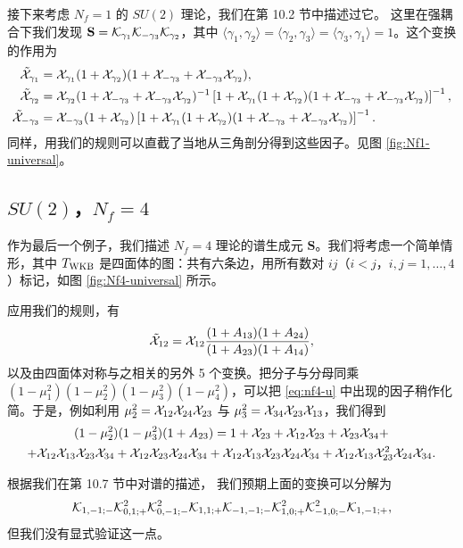 接下来考虑 $N_f=1$ 的 $SU(2)$ 理论，我们在第 10.2 节中描述过它。%
这里在强耦合下我们发现 $\mathbf S=\mathcal{K}_{\gamma_1}\mathcal{K}_{-\gamma_3}\mathcal{K}_{\gamma_2}$，其中 $\langle\gamma_1,\gamma_2\rangle=\langle\gamma_2,\gamma_3\rangle=\langle\gamma_3,\gamma_1\rangle=1$。这个变换的作用为
\begin{align}
\tilde{\mathcal{X}}_{\gamma_1}&=\mathcal{X}_{\gamma_1}(1+\mathcal{X}_{\gamma_2})(1+\mathcal{X}_{-\gamma_3}+\mathcal{X}_{-\gamma_3}\mathcal{X}_{\gamma_2}),\\
\tilde{\mathcal{X}}_{\gamma_2}&=\mathcal{X}_{\gamma_2}(1+\mathcal{X}_{-\gamma_3}+\mathcal{X}_{-\gamma_3}\mathcal{X}_{\gamma_2})^{-1}\left[1+\mathcal{X}_{\gamma_1}(1+\mathcal{X}_{\gamma_2})(1+\mathcal{X}_{-\gamma_3}+\mathcal{X}_{-\gamma_3}\mathcal{X}_{\gamma_2})\right]^{-1},\\
\tilde{\mathcal{X}}_{-\gamma_3}&=\mathcal{X}_{-\gamma_3}(1+\mathcal{X}_{\gamma_2})\left[1+\mathcal{X}_{\gamma_1}(1+\mathcal{X}_{\gamma_2})(1+\mathcal{X}_{-\gamma_3}+\mathcal{X}_{-\gamma_3}\mathcal{X}_{\gamma_2})\right]^{-1}.
\end{align}
同样，用我们的规则可以直截了当地从三角剖分得到这些因子。见图 \ref{fig:Nf1-universal}。


\subsection{$SU(2)$，$N_f=4$}

作为最后一个例子，我们描述 $N_f=4$ 理论的谱生成元 $\mathbf S$。我们将考虑一个简单情形，其中 $T_{\rm WKB}$ 是四面体的图：共有六条边，用所有数对 $ij$（$i<j$，$i,j=1,\dots,4$）标记，如图 \ref{fig:Nf4-universal} 所示。


应用我们的规则，有
\begin{equation}\label{eq:nf4-u}
\tilde{\mathcal{X}}_{12}=\mathcal{X}_{12}\frac{(1+A_{13})(1+A_{24})}{(1+A_{23})(1+A_{14})},
\end{equation}
以及由四面体对称与之相关的另外 5 个变换。把分子与分母同乘 $(1-\mu_1^{2})(1-\mu_2^{2})(1-\mu_3^{2})(1-\mu_4^{2})$，可以把 \eqref{eq:nf4-u} 中出现的因子稍作化简。于是，例如利用 $\mu_2^{2}=\mathcal{X}_{12}\mathcal{X}_{24}\mathcal{X}_{23}$ 与 $\mu_3^{2}=\mathcal{X}_{34}\mathcal{X}_{23}\mathcal{X}_{13}$，我们得到
\begin{multline}
(1-\mu_2^{2})(1-\mu_3^{2})(1+A_{23})=1+\mathcal{X}_{23}+\mathcal{X}_{12}\mathcal{X}_{23}+\mathcal{X}_{23}\mathcal{X}_{34}+\\
+\mathcal{X}_{12}\mathcal{X}_{13}\mathcal{X}_{23}\mathcal{X}_{34}+\mathcal{X}_{12}\mathcal{X}_{23}\mathcal{X}_{24}\mathcal{X}_{34}+\mathcal{X}_{12}\mathcal{X}_{13}\mathcal{X}_{23}\mathcal{X}_{24}\mathcal{X}_{34}+\mathcal{X}_{12}\mathcal{X}_{13}\mathcal{X}_{23}^2\mathcal{X}_{24}\mathcal{X}_{34}.
\end{multline}

根据我们在第 10.7 节中对谱的描述，%
我们预期上面的变换可以分解为
\begin{equation}\label{eq:12ParticlesKii}
\mathcal{K}_{1,-1;-}\mathcal{K}_{0,1;+}^2\mathcal{K}_{0,-1;-}^2\mathcal{K}_{1,1;+}\mathcal{K}_{-1,-1;-}\mathcal{K}_{1,0;+}^2\mathcal{K}_{-1,0;-}^2\mathcal{K}_{1,-1;+},
\end{equation}
但我们没有显式验证这一点。
